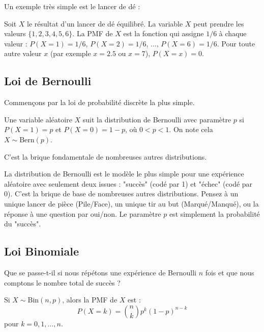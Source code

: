 Un exemple très simple est le lancer de dé :

\begin{examplebox}
Soit $X$ le résultat d'un lancer de dé équilibré. La variable $X$ peut prendre les valeurs $\{1, 2, 3, 4, 5, 6\}$.
La PMF de $X$ est la fonction qui assigne $1/6$ à chaque valeur :
$P(X=1) = 1/6$, $P(X=2) = 1/6$, ..., $P(X=6) = 1/6$.
Pour toute autre valeur $x$ (par exemple $x=2.5$ ou $x=7$), $P(X=x) = 0$.
\end{examplebox}

\subsection{Loi de Bernoulli}

Commençons par la loi de probabilité discrète la plus simple.

\begin{definitionbox}
Une variable aléatoire $X$ suit la distribution de Bernoulli avec paramètre $p$ si $P(X=1) = p$ et $P(X=0) = 1-p$, où $0 < p < 1$. On note cela $X \sim \text{Bern}(p)$.
\end{definitionbox}

C'est la brique fondamentale de nombreuses autres distributions.

\begin{intuitionbox}
La distribution de Bernoulli est le modèle le plus simple pour une expérience aléatoire avec seulement deux issues : "succès" (codé par 1) et "échec" (codé par 0). C'est la brique de base de nombreuses autres distributions. Pensez à un unique lancer de pièce (Pile/Face), un unique tir au but (Marqué/Manqué), ou la réponse à une question par oui/non. Le paramètre $p$ est simplement la probabilité du "succès".
\end{intuitionbox}

\subsection{Loi Binomiale}

Que se passe-t-il si nous répétons une expérience de Bernoulli $n$ fois et que nous comptons le nombre total de succès ?

\begin{theorembox}
Si $X \sim \text{Bin}(n, p)$, alors la PMF de $X$ est :
$$ P(X=k) = \binom{n}{k} p^k (1-p)^{n-k} $$
pour $k = 0, 1, \dots, n$.
\end{theorembox}

